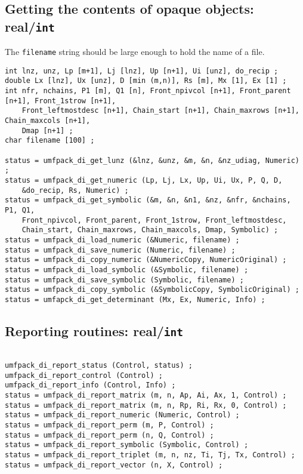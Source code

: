 \documentclass[11pt]{article}
\begin{document}
\subsection{Getting the contents of opaque objects: real/{\tt int}}

The {\tt filename} string should be large enough to hold the name of a file.

{\footnotesize
\begin{verbatim}
int lnz, unz, Lp [m+1], Lj [lnz], Up [n+1], Ui [unz], do_recip ;
double Lx [lnz], Ux [unz], D [min (m,n)], Rs [m], Mx [1], Ex [1] ;
int nfr, nchains, P1 [m], Q1 [n], Front_npivcol [n+1], Front_parent [n+1], Front_1strow [n+1],
    Front_leftmostdesc [n+1], Chain_start [n+1], Chain_maxrows [n+1], Chain_maxcols [n+1],
    Dmap [n+1] ;
char filename [100] ;

status = umfpack_di_get_lunz (&lnz, &unz, &m, &n, &nz_udiag, Numeric) ;
status = umfpack_di_get_numeric (Lp, Lj, Lx, Up, Ui, Ux, P, Q, D,
    &do_recip, Rs, Numeric) ;
status = umfpack_di_get_symbolic (&m, &n, &n1, &nz, &nfr, &nchains, P1, Q1,
    Front_npivcol, Front_parent, Front_1strow, Front_leftmostdesc,
    Chain_start, Chain_maxrows, Chain_maxcols, Dmap, Symbolic) ;
status = umfpack_di_load_numeric (&Numeric, filename) ;
status = umfpack_di_save_numeric (Numeric, filename) ;
status = umfpack_di_copy_numeric (&NumericCopy, NumericOriginal) ;
status = umfpack_di_load_symbolic (&Symbolic, filename) ;
status = umfpack_di_save_symbolic (Symbolic, filename) ;
status = umfpack_di_copy_symbolic (&SymbolicCopy, SymbolicOriginal) ;
status = umfapck_di_get_determinant (Mx, Ex, Numeric, Info) ;
\end{verbatim}
}

\subsection{Reporting routines: real/{\tt int}}

{\footnotesize
\begin{verbatim}

umfpack_di_report_status (Control, status) ;
umfpack_di_report_control (Control) ;
umfpack_di_report_info (Control, Info) ;
status = umfpack_di_report_matrix (m, n, Ap, Ai, Ax, 1, Control) ;
status = umfpack_di_report_matrix (m, n, Rp, Ri, Rx, 0, Control) ;
status = umfpack_di_report_numeric (Numeric, Control) ;
status = umfpack_di_report_perm (m, P, Control) ;
status = umfpack_di_report_perm (n, Q, Control) ;
status = umfpack_di_report_symbolic (Symbolic, Control) ;
status = umfpack_di_report_triplet (m, n, nz, Ti, Tj, Tx, Control) ;
status = umfpack_di_report_vector (n, X, Control) ;
\end{verbatim}
}
\end{document}
